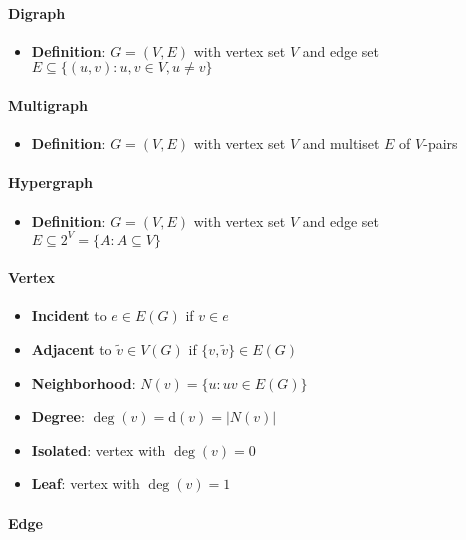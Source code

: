 \paragraph{Digraph}
\begin{itemize}
  \item \textbf{Definition}: $ G = (V,E) $ with vertex set $ V $ and edge set $ E \subseteq \{ (u,v) : u,v \in V, u \neq v \} $
\end{itemize}

\paragraph{Multigraph}
\begin{itemize}
  \item \textbf{Definition}: $ G = (V,E) $ with vertex set $ V $ and multiset $ E $ of $ V $-pairs
\end{itemize}

\paragraph{Hypergraph}
\begin{itemize}
  \item \textbf{Definition}: $ G = (V,E) $ with vertex set $ V $ and edge set $ E \subseteq 2^V = \{ A : A \subseteq V \} $
\end{itemize}

\paragraph{Vertex}
\begin{itemize}
  \item \textbf{Incident} to $ e \in E(G) $ if $ v \in e $
  \item \textbf{Adjacent} to $ \widetilde{v} \in V(G) $ if $ \{ v, \widetilde{v} \} \in E(G) $
  \item \textbf{Neighborhood}: $ N(v) = \{ u: uv \in E(G) \} $
  \item \textbf{Degree}: $ \deg(v) = \text{d}(v) = \vert N(v) \vert $
  \item \textbf{Isolated}: vertex with $ \deg(v) = 0 $
  \item \textbf{Leaf}: vertex with $ \deg(v) = 1 $
\end{itemize}

\paragraph{Edge}

